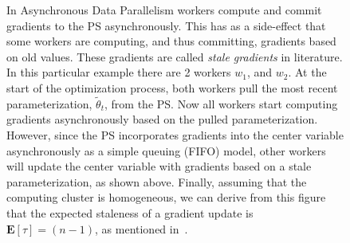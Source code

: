 \documentclass[wcp]{jmlr}
\begin{document}
\begin{figure}[H]
  \centering
  \caption{In Asynchronous Data Parallelism workers compute and commit gradients to the PS asynchronously. This has as a side-effect that some workers are computing, and thus committing, gradients based on old values. These gradients are called \emph{stale gradients} in literature. In this particular example there are 2 workers $w_1$, and $w_2$. At the start of the optimization process, both workers pull the most recent parameterization, $\tilde{\theta}_t$, from the PS. Now all workers start computing gradients asynchronously based on the pulled parameterization. However, since the PS incorporates gradients into the center variable asynchronously as a simple queuing (FIFO) model, other workers will update the center variable with gradients based on a stale parameterization, as shown above. Finally, assuming that the computing cluster is homogeneous, we can derive from this figure that the expected staleness of a gradient update is $\mathbf{E}[\tau] = (n - 1)$, as mentioned in~\cite{implicitmomentum}.}
  \label{fig:intro_asyn_data_parallelism}
\end{figure}
\end{document}
